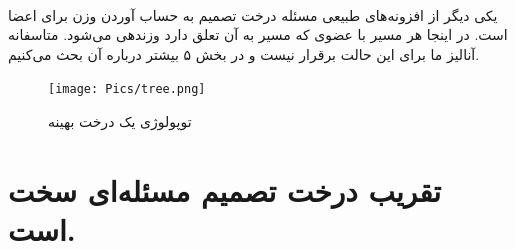 \documentclass[a4paper]{article}
\begin{document}
	\paragraph{}
	یکی دیگر از افزونه‌های طبیعی مسئله درخت تصمیم به حساب آوردن وزن برای اعضا است. در اینجا هر مسیر با عضوی که
	مسیر به آن تعلق دارد وزندهی می‌شود. متاسفانه آنالیز ما برای این حالت برقرار نیست و در بخش ۵ بیشتر درباره آن
	بحث می‌کنیم. 
	\begin{figure}[h!]
		\texttt{[image: Pics/tree.png]}
		\caption{توپولوژی یک درخت بهینه}
	\end{figure}
	\section{تقریب درخت تصمیم مسئله‌ای سخت است.}
\end{document}
